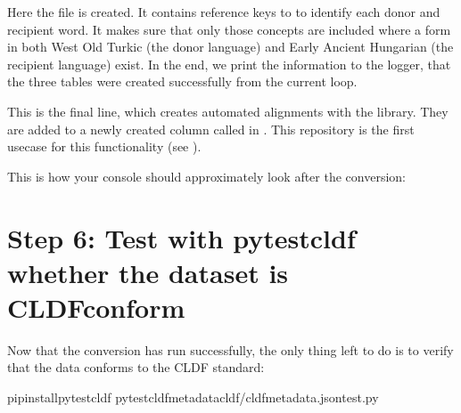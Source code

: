 \documentclass[letterpaper,10pt,english]{sphinxmanual}
\begin{document}
\sphinxAtStartPar
Here the file  is created. It contains reference keys
to  to identify each donor and recipient word. It makes sure
that only those concepts are included where a form in both West Old Turkic
(the donor language) and Early Ancient Hungarian (the recipient language)
exist. In the end, we print the information to the logger, that the three
tables were created successfully from the current loop.

\begin{sphinxVerbatim}[commandchars=\\\{\}]
\end{sphinxVerbatim}

\sphinxAtStartPar
This is the final line, which creates automated alignments with the
 library. They are added to a newly created
column called  in . This repository is the
first use\sphinxhyphen{}case for this functionality (see 
).

\sphinxAtStartPar
This is how your console should approximately look after the conversion:

\noindent{}


\section{Step 6: Test with pytest\sphinxhyphen{}cldf whether the dataset is CLDF\sphinxhyphen{}conform}
\label{\detokenize{mkcldf:step-6-test-with-pytest-cldf-whether-the-dataset-is-cldf-conform}}
\sphinxAtStartPar
Now that the conversion has run successfully, the only thing left to do is to
verify that the data conforms to the CLDF standard:

\begin{sphinxVerbatim}[commandchars=\\\{\}]
pipinstallpytest\PYGZhy{}cldf
pytest\PYGZhy{}\PYGZhy{}cldf\PYGZhy{}metadatacldf/cldf\PYGZhy{}metadata.jsontest.py
\end{sphinxVerbatim}
\end{document}
